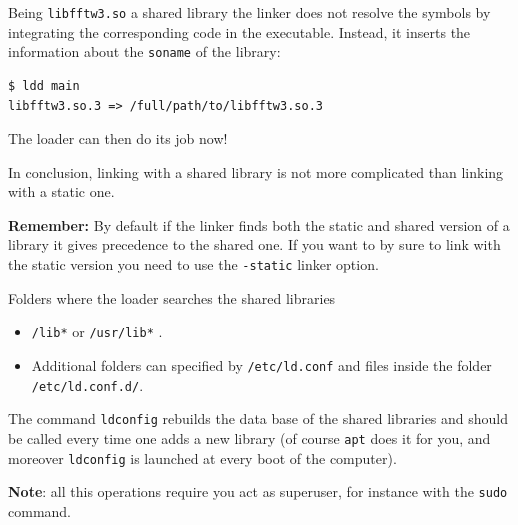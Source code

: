 \documentclass[10pt,aspectratio=169]{beamer}
\begin{document}
\begin{frame}[fragile]

  Being \texttt{libfftw3.so} a shared library the linker does not
  resolve the symbols by integrating the corresponding code in the
  executable. Instead, it inserts the information about the
  \texttt{soname} of the library:
  \smallskip

\begin{verbatim}
$ ldd main
libfftw3.so.3 => /full/path/to/libfftw3.so.3
\end{verbatim}
\smallskip
The loader can then do its job now!
\smallskip

In conclusion, linking with a shared library is not more complicated
than linking with a static one.
\medskip

\textbf{Remember:} By default if the linker finds both the static and
shared version of a library it gives precedence to the shared
one. If you want to by sure to link with the static version you need to use 
the \texttt{-static} linker option.
\end{frame}

\begin{frame}{Folders where the loader searches the shared libraries}  
	
	\begin{itemize}
		\item  \texttt{/lib*} or  \texttt{/usr/lib*} .
		\item Additional folders can specified by \texttt{/etc/ld.conf} and files inside the folder \texttt{/etc/ld.conf.d/}.
	\end{itemize}


  The command \texttt{ldconfig} rebuilds the data base of the shared
  libraries and should be called every time one adds a new library (of
  course \texttt{apt} does it for you, and moreover
  \texttt{ldconfig} is launched at every boot of the computer).
  \smallskip

  \textbf{Note}: all this operations require you act as superuser, for
  instance with the \texttt{sudo} command.
\end{frame}
\end{document}
